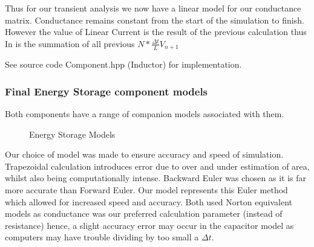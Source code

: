 \documentclass{article}
\begin{document}
\bigbreak

Thus for our transient analysis we now have a linear model for our conductance matrix. Conductance remains constant from the start of the simulation to finish. However the value of Linear Current is the result of the previous calculation thus In is the summation of all previous $ N * \frac{\Delta t}{L}V_{n+1}$

\bigbreak

See source code Component.hpp (Inductor) for implementation.

\newpage

\subsubsection{Final Energy Storage component models}
Both components have a range of companion models associated with them. 

\begin{figure}[h]%
    \centering
    \qquad
    \caption{Energy Storage Models}%
    \label{fig:example}%
\end{figure}

Our choice of model was made to ensure accuracy and speed of simulation. Trapezoidal calculation introduces error due to over and under estimation of area, whilst also being computationally intense. Backward Euler was chosen as it is far more accurate than Forward Euler. Our model represents this Euler method which allowed for increased speed and accuracy. Both used Norton equivalent models as conductance was our preferred calculation parameter (instead of resistance) hence, a slight accuracy error may occur in the capacitor model as computers may have trouble dividing by too small a $\Delta t$.
\end{document}
